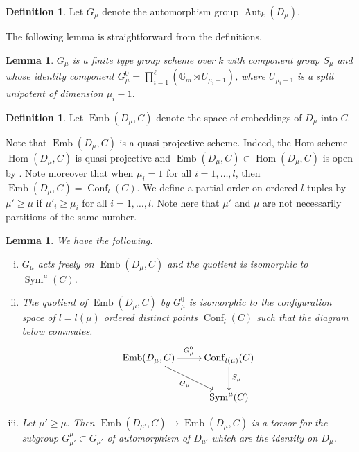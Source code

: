 \documentclass[a4paper,12pt]{amsart}
\newtheorem{lem}[thm]{Lemma}
\theoremstyle{definition}
\newtheorem{defn}[thm]{Definition}
\newcommand{\bG}{\mathbb{G}}
\DeclareMathOperator{\Emb}{Emb}
\DeclareMathOperator{\Conf}{Conf}
\DeclareMathOperator{\Sym}{Sym}
\DeclareMathOperator{\Hom}{Hom}
\DeclareMathOperator{\Aut}{Aut}
\begin{document}
	\begin{defn}
		Let $G_\mu$ denote the automorphism group $\Aut_k(D_\mu)$. 
	\end{defn}
	
	The following lemma is straightforward from the definitions.
	
	\begin{lem}\label{l:aut-ofD-mu} $G_\mu$ is a finite type group scheme over $k$ with component group $S_\mu$ and whose identity component $G^0_\mu=\prod_{i=1}^\ell(\bG_m\rtimes U_{\mu_i-1})$, where $U_{\mu_i-1}$ is a split unipotent of dimension $\mu_i-1$.
	\end{lem}
	
	\begin{defn} Let $\Emb(D_\mu, C)$ denote the space of embeddings of $D_\mu$ into $C$. 
	\end{defn}
	
	Note that $\Emb(D_\mu,C)$ is a quasi-projective scheme. Indeed, the Hom scheme $\Hom(D_\mu,C)$ is quasi-projective and $\Emb(D_\mu,C)\subset\Hom(D_\mu,C)$ is open by \cite[Prop. 12.93]{Wedhorn}. Note moreover that when $\mu_i = 1$ for all $i = 1, \ldots, l$, then $\Emb(D_\mu, C) = \Conf_l(C)$. We define a partial order on ordered $l$-tuples by $\mu' \geq \mu$ if $\mu'_i \geq \mu_i$ for all $i = 1, \ldots, l$. Note here that $\mu'$ and $\mu$ are not necessarily partitions of the same number.
	
	\begin{lem}\label{lemma:emb:torsor}
		We have the following.
		\begin{enumerate}[(i)]
			\item\label{lemma:emb:torsor::1} $G_\mu$ acts freely on $\Emb(D_\mu, C)$ and the quotient is isomorphic to $\Sym^\mu(C)$.
			\item\label{lemma:emb:torsor::2} The quotient of $\Emb(D_\mu,C)$ by $G_\mu^0$ is isomorphic to the configuration space of $l = l(\mu)$ ordered distinct points $\Conf_{l}(C)$ such that the diagram below commutes. 
			$$
			\xymatrix{\Emb(D_\mu, C) \ar[r]^{G^0_\mu} \ar[rd]_{G_\mu} & \Conf_{l(\mu)}(C) \ar[d]^{S_\mu} \\  & \Sym^\mu (C)}
			$$
			\item\label{lemma:emb:torsor::3} Let $\mu' \geq \mu$. Then $\Emb(D_{\mu'}, C) \to \Emb(D_\mu, C)$ is a torsor for the subgroup $G^{\mu}_{\mu'} \subset G_{\mu'}$ of automorphism of $D_{\mu'}$ which are the identity on $D_{\mu}$.
		\end{enumerate} 
	\end{lem}
	
\end{document}
